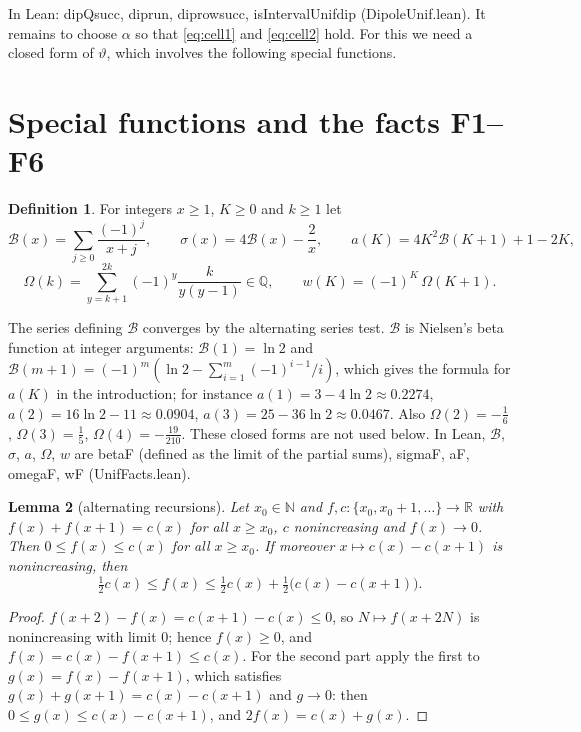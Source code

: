 \documentclass[11pt]{amsart}
\newtheorem{lemma}{Lemma}[section]
\theoremstyle{definition}
\newtheorem{definition}[lemma]{Definition}
\theoremstyle{remark}
\numberwithin{equation}{section}
\newcommand{\R}{\mathbb{R}}
\newcommand{\N}{\mathbb{N}}
\newcommand{\cB}{\mathcal{B}}
\newcommand{\leanus}{\textunderscore\allowbreak}
\newcommand{\lean}[1]{{\ttfamily\let\_\leanus #1}}
\begin{document}
In Lean: \lean{dipQ\_succ}, \lean{dip\_run}, \lean{dip\_row\_succ}, \lean{isIntervalUnif\_dip}
(\lean{DipoleUnif.lean}). It remains to choose $\alpha$ so that \eqref{eq:cell1} and \eqref{eq:cell2}
hold. For this we need a closed form of $\vartheta$, which involves the following special functions.

\section{Special functions and the facts F1--F6}\label{sec:special}

\begin{definition}\label{def:special}
For integers $x\ge1$, $K\ge0$ and $k\ge1$ let
\[
  \cB(x)=\sum_{j\ge0}\frac{(-1)^j}{x+j},\qquad \sigma(x)=4\cB(x)-\frac2x,\qquad
  a(K)=4K^2\cB(K+1)+1-2K,
\]
\[
  \Omega(k)=\sum_{y=k+1}^{2k}(-1)^y\frac{k}{y(y-1)}\in\mathbb{Q},\qquad w(K)=(-1)^K\,\Omega(K+1).
\]
\end{definition}

The series defining $\cB$ converges by the alternating series test. $\cB$ is Nielsen's beta function
at integer arguments: $\cB(1)=\ln2$ and $\cB(m+1)=(-1)^m(\ln2-\sum_{i=1}^m(-1)^{i-1}/i)$, which gives
the formula for $a(K)$ in the introduction; for instance $a(1)=3-4\ln2\approx0.2274$,
$a(2)=16\ln2-11\approx0.0904$, $a(3)=25-36\ln2\approx0.0467$. Also $\Omega(2)=-\frac16$,
$\Omega(3)=\frac15$, $\Omega(4)=-\frac{19}{210}$. These closed forms are not used below. In Lean,
$\cB$, $\sigma$, $a$, $\Omega$, $w$ are \lean{betaF} (defined as the limit of the partial sums),
\lean{sigmaF}, \lean{aF}, \lean{omegaF}, \lean{wF} (\lean{UnifFacts.lean}).

\begin{lemma}[alternating recursions]\label{lem:alt}
Let $x_0\in\N$ and $f,c:\{x_0,x_0+1,\dots\}\to\R$ with $f(x)+f(x+1)=c(x)$ for all $x\ge x_0$, $c$
nonincreasing and $f(x)\to0$. Then $0\le f(x)\le c(x)$ for all $x\ge x_0$. If moreover $x\mapsto c(x)-c(x+1)$
is nonincreasing, then
\[
  \tfrac12c(x)\le f(x)\le\tfrac12c(x)+\tfrac12\bigl(c(x)-c(x+1)\bigr).
\]
\end{lemma}

\begin{proof}
$f(x+2)-f(x)=c(x+1)-c(x)\le0$, so $N\mapsto f(x+2N)$ is nonincreasing with limit $0$; hence $f(x)\ge0$, and
$f(x)=c(x)-f(x+1)\le c(x)$. For the second part apply the first to $g(x)=f(x)-f(x+1)$, which satisfies
$g(x)+g(x+1)=c(x)-c(x+1)$ and $g\to0$: then $0\le g(x)\le c(x)-c(x+1)$, and $2f(x)=c(x)+g(x)$.
\end{proof}
\end{document}
